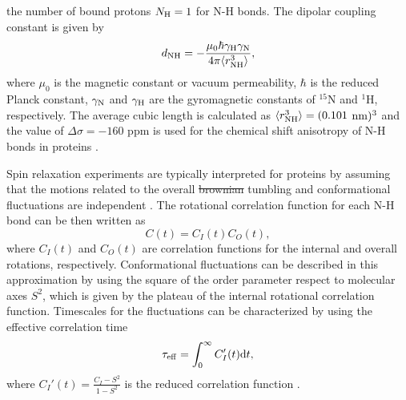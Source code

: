\documentclass[journal=jpcbfk,manuscript=article]{achemso}
\providecommand{\DIFadd}[1]{{\protect\color{blue}\uwave{#1}}} %
\providecommand{\DIFdel}[1]{{\protect\color{red}\sout{#1}}}                      %
\providecommand{\DIFaddbegin}{} %
\providecommand{\DIFaddend}{} %
\providecommand{\DIFdelbegin}{} %
\providecommand{\DIFdelend}{} %
\begin{document}
the number of bound protons $N_{\rm{H}}=1$ for N-H bonds.
The dipolar coupling constant is given by
\begin{equation}
d_{\rm{NH}}=-\frac{\mu_0\hbar\gamma_{\rm{H}}\gamma_{\rm{N}}}{4\pi\langle r_{\rm{NH}}^3\rangle},\nonumber
\end{equation}
where $\mu_0$ is the magnetic constant or vacuum permeability, $\hbar$ is the reduced Planck constant,
$\gamma_{\rm{N}}$ and $\gamma_{\rm{H}}$ are the gyromagnetic constants of $^{15}$N and $^1$H, respectively.
The average cubic length is calculated as $\langle r_{\rm{NH}}^3\rangle = (0.101$ ${\rm nm})^3$ and the 
value of $\Delta \sigma = -160$ ppm is used for the chemical shift anisotropy of N-H bonds in 
proteins \cite{kay89,hiyama88}.

Spin relaxation experiments are typically interpreted for proteins by
assuming that the motions related to the overall \DIFdelbegin \DIFdel{brownian }\DIFdelend \DIFaddbegin \DIFadd{Brownian }\DIFaddend tumbling 
and conformational fluctuations are independent \DIFaddbegin \DIFadd{\mbox{%
\cite{halle09}}%
}\DIFaddend .
The rotational correlation function for each N-H bond can be then written
as  \cite{wennerstrom79,Lipari82,jarymowycz06,korzhnev01,halle09}
\begin{equation}\label{CORRFsep}
  C(t)=C_I(t)C_O(t),
\end{equation}
where $C_I(t)$ and $C_O(t)$ are correlation functions for the internal \DIFaddbegin \DIFadd{dynamics }\DIFaddend and overall
rotations, respectively. Conformational fluctuations can be described
in this approximation by using the square of the order parameter respect to 
molecular axes $S^2$, which is given by the plateau of the internal rotational 
correlation function. Timescales for the fluctuations can be characterized by
using the effective correlation time 
\begin{equation}\label{effCT}
  \tau_{\rm eff}=\int_0^\infty C_I'(t) \mathrm{d}t,
\end{equation}
where $C_I'(t)=\frac{C_I-S^2}{1-S^2}$ is the reduced correlation function \cite{Lipari82}.
\end{document}
